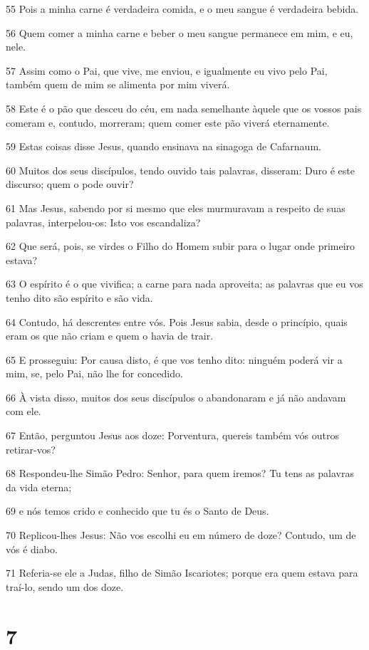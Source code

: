 \par 55 Pois a minha carne é verdadeira comida, e o meu sangue é verdadeira bebida.
\par 56 Quem comer a minha carne e beber o meu sangue permanece em mim, e eu, nele.
\par 57 Assim como o Pai, que vive, me enviou, e igualmente eu vivo pelo Pai, também quem de mim se alimenta por mim viverá.
\par 58 Este é o pão que desceu do céu, em nada semelhante àquele que os vossos pais comeram e, contudo, morreram; quem comer este pão viverá eternamente.
\par 59 Estas coisas disse Jesus, quando ensinava na sinagoga de Cafarnaum.
\par 60 Muitos dos seus discípulos, tendo ouvido tais palavras, disseram: Duro é este discurso; quem o pode ouvir?
\par 61 Mas Jesus, sabendo por si mesmo que eles murmuravam a respeito de suas palavras, interpelou-os: Isto vos escandaliza?
\par 62 Que será, pois, se virdes o Filho do Homem subir para o lugar onde primeiro estava?
\par 63 O espírito é o que vivifica; a carne para nada aproveita; as palavras que eu vos tenho dito são espírito e são vida.
\par 64 Contudo, há descrentes entre vós. Pois Jesus sabia, desde o princípio, quais eram os que não criam e quem o havia de trair.
\par 65 E prosseguiu: Por causa disto, é que vos tenho dito: ninguém poderá vir a mim, se, pelo Pai, não lhe for concedido.
\par 66 À vista disso, muitos dos seus discípulos o abandonaram e já não andavam com ele.
\par 67 Então, perguntou Jesus aos doze: Porventura, quereis também vós outros retirar-vos?
\par 68 Respondeu-lhe Simão Pedro: Senhor, para quem iremos? Tu tens as palavras da vida eterna;
\par 69 e nós temos crido e conhecido que tu és o Santo de Deus.
\par 70 Replicou-lhes Jesus: Não vos escolhi eu em número de doze? Contudo, um de vós é diabo.
\par 71 Referia-se ele a Judas, filho de Simão Iscariotes; porque era quem estava para traí-lo, sendo um dos doze.

\chapter{7}


